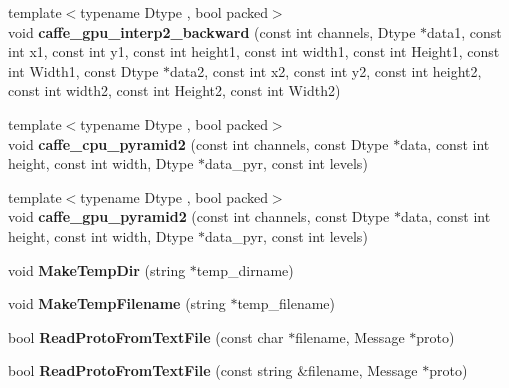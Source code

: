 \begin{DoxyCompactItemize}
\item 
{\footnotesize template$<$typename Dtype , bool packed$>$ }\\void {\bfseries caffe\+\_\+gpu\+\_\+interp2\+\_\+backward} (const int channels, Dtype $\ast$data1, const int x1, const int y1, const int height1, const int width1, const int Height1, const int Width1, const Dtype $\ast$data2, const int x2, const int y2, const int height2, const int width2, const int Height2, const int Width2)\hypertarget{namespacecaffe_a5ee91c1c264bbba105750421a9d7240e}{}\label{namespacecaffe_a5ee91c1c264bbba105750421a9d7240e}

\item 
{\footnotesize template$<$typename Dtype , bool packed$>$ }\\void {\bfseries caffe\+\_\+cpu\+\_\+pyramid2} (const int channels, const Dtype $\ast$data, const int height, const int width, Dtype $\ast$data\+\_\+pyr, const int levels)\hypertarget{namespacecaffe_a7f105cbfa29d106902767c09524509fe}{}\label{namespacecaffe_a7f105cbfa29d106902767c09524509fe}

\item 
{\footnotesize template$<$typename Dtype , bool packed$>$ }\\void {\bfseries caffe\+\_\+gpu\+\_\+pyramid2} (const int channels, const Dtype $\ast$data, const int height, const int width, Dtype $\ast$data\+\_\+pyr, const int levels)\hypertarget{namespacecaffe_a605726f2953a929442d1122f64beea9d}{}\label{namespacecaffe_a605726f2953a929442d1122f64beea9d}

\item 
void {\bfseries Make\+Temp\+Dir} (string $\ast$temp\+\_\+dirname)\hypertarget{namespacecaffe_a5492e800dfacd1efe281b1e1a2eb771c}{}\label{namespacecaffe_a5492e800dfacd1efe281b1e1a2eb771c}

\item 
void {\bfseries Make\+Temp\+Filename} (string $\ast$temp\+\_\+filename)\hypertarget{namespacecaffe_aa75d4eed8de6fef77d7af47febca4864}{}\label{namespacecaffe_aa75d4eed8de6fef77d7af47febca4864}

\item 
bool {\bfseries Read\+Proto\+From\+Text\+File} (const char $\ast$filename, Message $\ast$proto)\hypertarget{namespacecaffe_ab384abf6f635e4c5e2a779a5ec8223b6}{}\label{namespacecaffe_ab384abf6f635e4c5e2a779a5ec8223b6}

\item 
bool {\bfseries Read\+Proto\+From\+Text\+File} (const string \&filename, Message $\ast$proto)\hypertarget{namespacecaffe_a8e9cbf61e86c52f68a7adefe8d5380e7}{}\label{namespacecaffe_a8e9cbf61e86c52f68a7adefe8d5380e7}


\end{DoxyCompactItemize}
